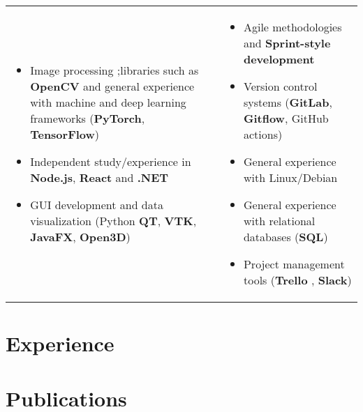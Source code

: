 \documentclass[letterpaper]{twentysecondcv} %
\begin{document}
\begin{tabularx}{\linewidth}{XX}
	\begin{itemize}
		\item Image processing ;libraries such as \textbf{OpenCV} and general experience with machine and deep learning frameworks (\textbf{PyTorch}, \textbf{TensorFlow})
		\item Independent study/experience in \textbf{Node.js}, \textbf{React} and \textbf{.NET}
		\item GUI development and data visualization (Python \textbf{QT}, \textbf{VTK}, \textbf{JavaFX}, \textbf{Open3D})
	\end{itemize} & 
	\begin{itemize}
		\item Agile methodologies and \textbf{Sprint-style development}
		\item Version control systems (\textbf{GitLab}, \textbf{Gitflow}, GitHub actions)
		\item General experience with Linux/Debian
		\item General experience with relational databases (\textbf{SQL})
		\item Project management tools (\textbf{Trello} , \textbf{Slack})
	\end{itemize} \\
\end{tabularx}





\section*{Experience}

\experience





\section*{Publications}

\publications
\end{document}
